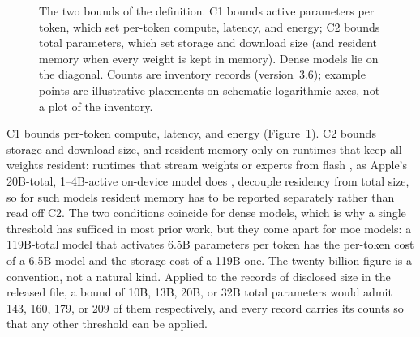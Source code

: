 \begin{figure}[t]
\caption{The two bounds of the definition. C1 bounds active parameters per token, which set per-token compute, latency, and energy; C2 bounds total parameters, which set storage and download size (and resident memory when every weight is kept in memory). Dense models lie on the diagonal. Counts are inventory records (version~3.6); example points are illustrative placements on schematic logarithmic axes, not a plot of the inventory.}
\label{fig:slm_definition}
\end{figure}

C1 bounds per-token compute, latency, and energy (Figure~\ref{fig:slm_definition}). C2 bounds storage and download size, and resident memory only on runtimes that keep all weights resident: runtimes that stream weights or experts from flash \citep{alizadeh2024llmflash}, as Apple's 20B-total, 1--4B-active on-device model does \citep{apple2026afm3}, decouple residency from total size, so for such models resident memory has to be reported separately rather than read off C2. The two conditions coincide for dense models, which is why a single threshold has sufficed in most prior work, but they come apart for \gls{moe} models: a 119B-total model that activates 6.5B parameters per token has the per-token cost of a 6.5B model and the storage cost of a 119B one. The twenty-billion figure is a convention, not a natural kind. Applied to the records of disclosed size in the released file, a bound of 10B, 13B, 20B, or 32B total parameters would admit 143, 160, 179, or 209 of them respectively, and every record carries its counts so that any other threshold can be applied.

